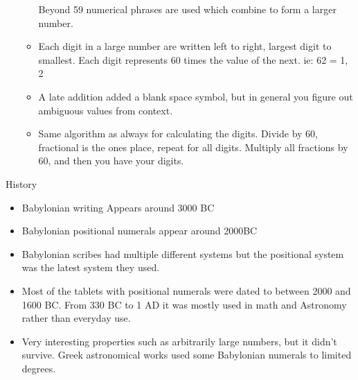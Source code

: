 \documentclass{report}
\begin{document}
\begin{description}
\begin{mdframed}
\begin{itemize}
\begin{itemize}
\begin{mdframed}
                                Beyond 59 numerical phrases are used
                                which combine to form a larger number.
                            \end{mdframed}
                        \item Each digit in a large number are written
                            left to right, largest digit to smallest.
                            Each digit represents 60 times the value
                            of the next.
                            ie:
                            62 = 1, 2
                        \item A late addition added a blank space symbol,
                            but in general you figure out ambiguous values
                            from context.
                        \item Same algorithm as always for calculating the
                            digits. Divide by 60, fractional is the ones
                            place, repeat for all digits. Multiply all
                            fractions by 60, and then you have your digits.
                    \end{itemize}
            \end{itemize}
        \end{mdframed}
    \item {\large History}
        \begin{mdframed}
            \begin{itemize}
                \item Babylonian writing Appears around 
                    3000 BC
                \item Babylonian positional numerals
                    appear around 2000BC
                \item Babylonian scribes had multiple different
                    systems but the positional system was
                    the latest system they used.
                \item Most of the tablets with positional
                    numerals were dated to between 2000 and
                    1600 BC. From 330 BC to 1 AD it was mostly
                    used in math and Astronomy rather than
                    everyday use.
                \item Very interesting properties such as arbitrarily
                    large numbers, but it didn't survive. Greek
                    astronomical works used some Babylonian numerals
                    to limited degrees.
            \end{itemize}
        \end{mdframed}
\end{description}
\end{document}
